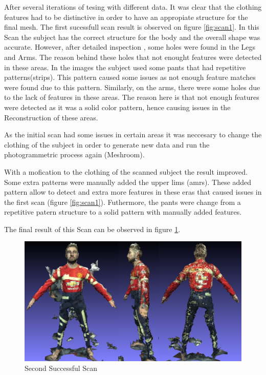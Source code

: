 \documentclass[12pt]{report}
\begin{document}
After several iterations of tesing with different data. It was clear that the clothing features had to be distinctive in order to have an appropiate structure for the final mesh.
The first sucessfull scan result is observed on figure \ref{fig:scan1}.
In this Scan the subject has the correct structure for the body and the overall shape was accurate. However, after detailed inspection , some holes were found in the Legs and Arms.
The reason behind these holes that not enought features were detected in these areas. In the images the subject used some pants that had repetitive patterns(strips). 
This pattern caused some issues as not enough feature matches were found due to this pattern. 
Similarly, on the arms, there were some holes due to the lack of features in these areas. The reason here is that not enough features were detected as it was a solid color pattern, hence causing issues in the Reconstruction of these areas. 

As the initial scan had some issues in certain areas it was neccesary to change the clothing of the subject in order to generate new data and run the photogrammetric process again (Meshroom). 

With a mofication to the clothing of the scanned subject the result improved.
Some extra patterns were manually added the upper lims (amrs). These added pattern allow to detect and extra more features in these eras that caused issues in the first scan (figure \ref{fig:scan1}).
Futhermore, the pants were change from a repetitive patern structure to a solid pattern with manually added features. 

The final result of this Scan can be observed in figure \ref{fig:scan2}.
\begin{figure}[H]%
  \centering
 \includegraphics[width=1\textwidth]{scan2.png}
\caption{Second Successful Scan}
\label{fig:scan2} 
\end{figure}
\end{document}
